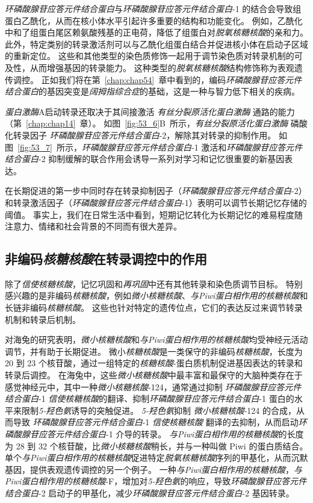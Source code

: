 \textit{环磷酸腺苷应答元件结合蛋白}与\textit{环磷酸腺苷应答元件结合蛋白}-1 的结合会导致组蛋白乙酰化，从而在核小体水平引起许多重要的结构和功能变化。
例如，乙酰化中和了组蛋白尾区赖氨酸残基的正电荷，降低了组蛋白对\textit{脱氧核糖核酸}的亲和力。
此外，特定类别的转录激活剂可以与乙酰化组蛋白结合并促进核小体在启动子区域的重新定位。
这些和其他类型的染色质修饰一起用于调节染色质对转录机制的可及性，从而增强基因的转录能力。
这种类型的\textit{脱氧核糖核酸}结构修饰称为表观遗传调控。
正如我们将在第~\ref{chap:chap54}~章中看到的，编码\textit{环磷酸腺苷应答元件结合蛋白}的基因突变是\textit{阔拇指综合症}的基础，这是一种与智力低下相关的疾病。


\textit{蛋白激酶}A启动转录还取决于其间接激活 \textit{有丝分裂原活化蛋白激酶} 通路的能力（第~\ref{chap:chap14}~章）。
如图~\ref{fig:53_6}B~所示，\textit{有丝分裂原活化蛋白激酶} 磷酸化转录因子 \textit{环磷酸腺苷应答元件结合蛋白}-2，解除其对转录的抑制作用。
如图~\ref{fig:53_7}~所示，\textit{环磷酸腺苷应答元件结合蛋白}-1 激活和\textit{环磷酸腺苷应答元件结合蛋白}-2 抑制缓解的联合作用会诱导一系列对学习和记忆很重要的新基因表达。


在长期促进的第一步中同时存在转录抑制因子（\textit{环磷酸腺苷应答元件结合蛋白}-2）和转录激活因子（\textit{环磷酸腺苷应答元件结合蛋白}-1）表明可以调节长期记忆存储的阈值。
事实上，我们在日常生活中看到，短期记忆转化为长期记忆的难易程度随注意力、情绪和社会背景的不同而有很大差异。



\subsection{非编码\textit{核糖核酸}在转录调控中的作用}

除了\textit{信使核糖核酸}，记忆巩固和\textit{再巩固}中还有其他转录和染色质调节目标。
特别感兴趣的是非编码\textit{核糖核酸}，例如\textit{微小核糖核酸}、\textit{与Piwi蛋白相作用的核糖核酸}和长链非编码\textit{核糖核酸}。
这些也针对特定的遗传位点，它们的表达反过来调节转录机制和转录后机制。


对海兔的研究表明，\textit{微小核糖核酸}和\textit{与Piwi蛋白相作用的核糖核酸}均受神经元活动调节，并有助于长期促进。
微小\textit{核糖核酸}是一类保守的非编码\textit{核糖核酸}，长度为 20 到 23 个核苷酸，通过一组特定的\textit{核糖核酸}-蛋白质机制促进基因表达的转录和转录后调控。
在海兔中，这些\textit{微小核糖核酸}中最丰富和最保守的大脑种类存在于感觉神经元中，其中一种\textit{微小核糖核酸}-124，通常通过抑制 \textit{环磷酸腺苷应答元件结合蛋白}-1 \textit{信使核糖核酸}的翻译、抑制\textit{环磷酸腺苷应答元件结合蛋白}-1 蛋白的水平来限制\textit{5-羟色氨}诱导的突触促进。
\textit{5-羟色氨}抑制 \textit{微小核糖核酸}-124 的合成，从而导致 \textit{环磷酸腺苷应答元件结合蛋白}-1 \textit{信使核糖核酸} 翻译的去抑制，从而启动\textit{环磷酸腺苷应答元件结合蛋白}-1 介导的转录。
\textit{与Piwi蛋白相作用的核糖核酸}的长度为 28 到 32 个核苷酸，比\textit{微小核糖核酸}稍长，并与一种叫做 Piwi 的蛋白质结合。
单个\textit{与Piwi蛋白相作用的核糖核酸}促进特定\textit{脱氧核糖核酸}序列的甲基化，从而沉默基因，提供表观遗传调控的另一个例子。
一种\textit{与Piwi蛋白相作用的核糖核酸}，\textit{与Piwi蛋白相作用的核糖核酸}-F，增加对\textit{5-羟色氨}的响应，导致\textit{环磷酸腺苷应答元件结合蛋白}-2 启动子的甲基化，减少\textit{环磷酸腺苷应答元件结合蛋白}-2 基因转录。


